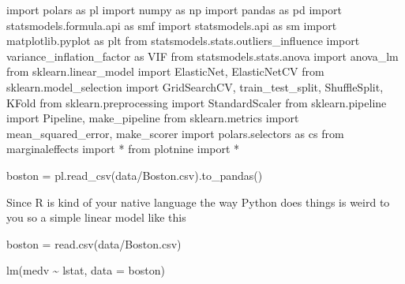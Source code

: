 \documentclass[
  letterpaper,
  DIV=11,
  numbers=noendperiod]{scrreprt}
\newenvironment{Shaded}{\begin{snugshade}}{\end{snugshade}}
\newcommand{\AttributeTok}[1]{\textcolor[rgb]{0.40,0.45,0.13}{#1}}
\newcommand{\FunctionTok}[1]{\textcolor[rgb]{0.28,0.35,0.67}{#1}}
\newcommand{\ImportTok}[1]{\textcolor[rgb]{0.00,0.46,0.62}{#1}}
\newcommand{\NormalTok}[1]{\textcolor[rgb]{0.00,0.23,0.31}{#1}}
\newcommand{\OperatorTok}[1]{\textcolor[rgb]{0.37,0.37,0.37}{#1}}
\newcommand{\OtherTok}[1]{\textcolor[rgb]{0.00,0.23,0.31}{#1}}
\newcommand{\SpecialCharTok}[1]{\textcolor[rgb]{0.37,0.37,0.37}{#1}}
\newcommand{\StringTok}[1]{\textcolor[rgb]{0.13,0.47,0.30}{#1}}
\begin{document}
\begin{Shaded}
\begin{Highlighting}[]
\ImportTok{import}\NormalTok{ polars }\ImportTok{as}\NormalTok{ pl }
\ImportTok{import}\NormalTok{ numpy }\ImportTok{as}\NormalTok{ np}
\ImportTok{import}\NormalTok{ pandas }\ImportTok{as}\NormalTok{ pd }
\ImportTok{import}\NormalTok{ statsmodels.formula.api }\ImportTok{as}\NormalTok{ smf }
\ImportTok{import}\NormalTok{ statsmodels.api }\ImportTok{as}\NormalTok{ sm}
\ImportTok{import}\NormalTok{ matplotlib.pyplot }\ImportTok{as}\NormalTok{ plt}
\ImportTok{from}\NormalTok{ statsmodels.stats.outliers\_influence }\ImportTok{import}\NormalTok{ variance\_inflation\_factor }\ImportTok{as}\NormalTok{ VIF}
\ImportTok{from}\NormalTok{ statsmodels.stats.anova }\ImportTok{import}\NormalTok{ anova\_lm}
\ImportTok{from}\NormalTok{ sklearn.linear\_model }\ImportTok{import}\NormalTok{ ElasticNet, ElasticNetCV}
\ImportTok{from}\NormalTok{ sklearn.model\_selection }\ImportTok{import}\NormalTok{ GridSearchCV, train\_test\_split, ShuffleSplit, KFold}
\ImportTok{from}\NormalTok{ sklearn.preprocessing }\ImportTok{import}\NormalTok{ StandardScaler}
\ImportTok{from}\NormalTok{ sklearn.pipeline }\ImportTok{import}\NormalTok{ Pipeline, make\_pipeline}
\ImportTok{from}\NormalTok{ sklearn.metrics }\ImportTok{import}\NormalTok{ mean\_squared\_error, make\_scorer}
\ImportTok{import}\NormalTok{ polars.selectors }\ImportTok{as}\NormalTok{ cs}
\ImportTok{from}\NormalTok{ marginaleffects }\ImportTok{import} \OperatorTok{*}
\ImportTok{from}\NormalTok{ plotnine }\ImportTok{import} \OperatorTok{*}


\NormalTok{boston }\OperatorTok{=}\NormalTok{ pl.read\_csv(}\StringTok{\textquotesingle{}data/Boston.csv\textquotesingle{}}\NormalTok{).to\_pandas()}
\end{Highlighting}
\end{Shaded}

Since R is kind of your native language the way Python does things is
weird to you so a simple linear model like this

\begin{Shaded}
\begin{Highlighting}[]
\NormalTok{boston }\OtherTok{=} \FunctionTok{read.csv}\NormalTok{(}\StringTok{\textquotesingle{}data/Boston.csv\textquotesingle{}}\NormalTok{)}

\FunctionTok{lm}\NormalTok{(medv }\SpecialCharTok{\textasciitilde{}}\NormalTok{ lstat, }\AttributeTok{data =}\NormalTok{ boston)}
\end{Highlighting}
\end{Shaded}
\end{document}
